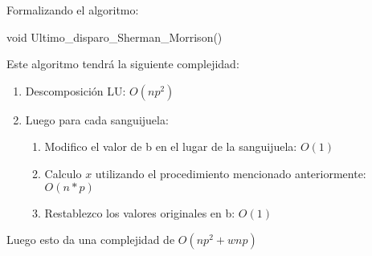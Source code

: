 Formalizando el algoritmo:
\begin{algorithm}
\begin{algorithmic}[1]\parskip=1mm
\caption{void Ultimo\_disparo\_Sherman\_Morrison()}
\end{algorithmic}
\end{algorithm}

Este algoritmo tendrá la siguiente complejidad:
\begin{enumerate}
 \item Descomposición LU: $O(np^2)$
 \item Luego para cada sanguijuela:
\begin{enumerate}
\item Modifico el valor de b en el lugar de la sanguijuela: $O(1)$
\item Calculo $x$ utilizando el procedimiento mencionado anteriormente: $O(n*p)$
\item Restablezco los valores originales en b: $O(1)$
\end{enumerate}  
\end{enumerate}
Luego esto da una complejidad de $O(np^2 + wnp)$
